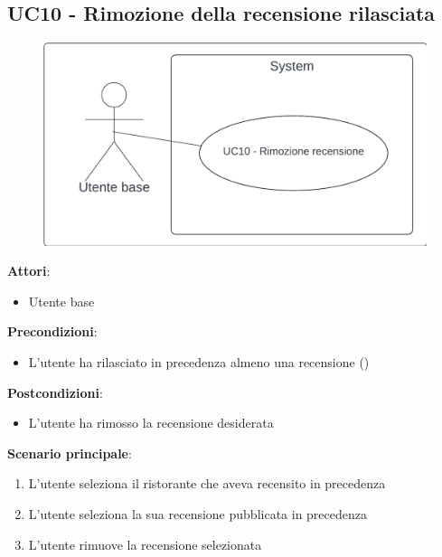 \subsection{UC10 - Rimozione della recensione rilasciata} \label{usecase:10}
\begin{figure}[H]
    \centering
    \includegraphics[width=0.75\linewidth]{ucd/UCD10.png}
\end{figure}
\textbf{Attori}:
\begin{itemize}
    \item Utente base
\end{itemize}
\textbf{Precondizioni}:
\begin{itemize}
    \item L'utente ha rilasciato in precedenza almeno una recensione ()
\end{itemize}
\textbf{Postcondizioni}:
\begin{itemize}
    \item L'utente ha rimosso la recensione desiderata
\end{itemize}
\textbf{Scenario principale}:
\begin{enumerate}
    \item L'utente seleziona il ristorante che aveva recensito in precedenza
    \item L'utente seleziona la sua recensione pubblicata in precedenza
    \item L'utente rimuove la recensione selezionata
\end{enumerate}
\newpage
